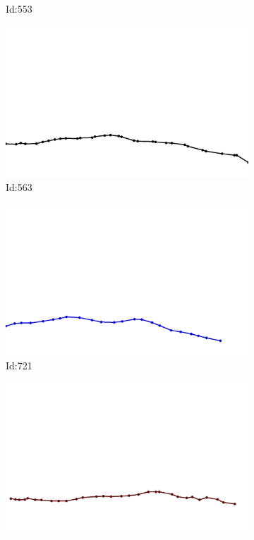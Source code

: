 \documentclass[12pt,twoside]{report}
\begin{document}
\begin{figure}
\begin{subfigure}[b]{0.20\textwidth}
\caption{Id:553}
\end{subfigure}
\begin{subfigure}[b]{0.20\textwidth}
\centering
\includegraphics[width=\textwidth]{../../trajectories/563.png}
\caption{Id:563}
\end{subfigure}
\begin{subfigure}[b]{0.20\textwidth}
\centering
\includegraphics[width=\textwidth]{../../trajectories/721.png}
\caption{Id:721}
\end{subfigure}
\begin{subfigure}[b]{0.20\textwidth}
\centering
\includegraphics[width=\textwidth]{../../trajectories/820.png}

\end{subfigure}
\end{figure}
\end{document}
